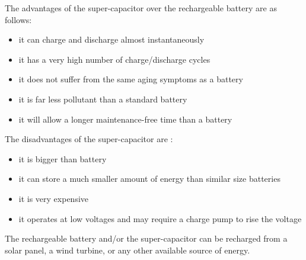 The advantages of the super-capacitor over the rechargeable battery are as follows:

\begin{itemize}
\item it can charge and discharge almost instantaneously 
\item it has a very high number of charge/discharge cycles 
\item it does not suffer from the same aging symptoms as a battery
\item it is far less pollutant than a standard battery
\item it will allow a longer maintenance-free time than a battery

\end{itemize}

The disadvantages of the super-capacitor are :

\begin{itemize}
\item it is bigger than battery
\item it can store a much smaller amount of energy than similar size batteries
\item it is very expensive
\item it operates at low voltages and may require a charge pump to rise the voltage

\end{itemize}

The rechargeable battery and/or the super-capacitor can be recharged from a solar panel, a wind turbine, or any other available source of energy.

